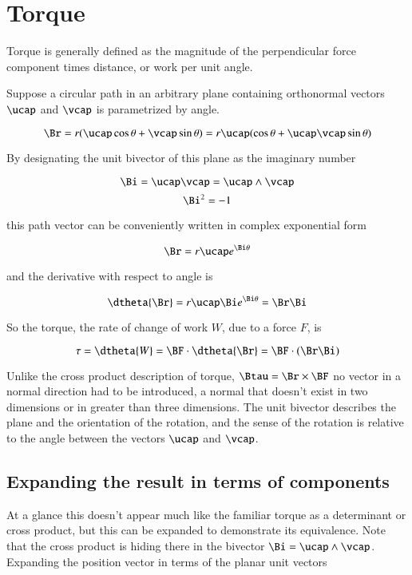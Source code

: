 \chapter{Torque}
\label{chap:gaWikiTorque}
\date{ Oct 13, 2007.  $RCSfile: gaWikiTorque.tex,v $ Last $Revision: 1.13 $ $Date: 2009/06/18 03:31:04 $ }

Torque is generally defined as the magnitude of the perpendicular force component times distance, or work per unit angle.

Suppose a circular path in an arbitrary plane containing orthonormal vectors $\ucap$ and $\vcap$ is parametrized by angle.

\[
\Br = r(\ucap \cos \theta + \vcap \sin \theta) = r \ucap(\cos \theta + \ucap \vcap \sin \theta)
\]

By designating the unit bivector of this plane as the imaginary number

\[
\Bi  = \ucap \vcap = \ucap \wedge \vcap
\]
\[
\Bi ^2 = -1
\]

this path vector can be conveniently written in complex exponential form

\[
\Br = r \ucap e^{\Bi \theta}
\]

and the derivative with respect to angle is

\[
\dtheta{\Br} = r \ucap \Bi  e^{\Bi  \theta} = \Br  \Bi 
\]

So the torque, the rate of change of work $W$, due to a force $F$, is

\[
\tau = \dtheta{W} = \BF \cdot \dtheta{\Br} = \BF \cdot (\Br  \Bi )
\]

Unlike the cross product description of torque, $\Btau = \Br \times \BF$ no vector in a normal direction had to be introduced, a normal that doesn't exist in two dimensions or in greater than three dimensions.  The unit bivector describes the plane and the orientation of the rotation, and the sense of the rotation is relative to the angle between the vectors $\ucap$ and $\vcap$.

\section{Expanding the result in terms of components }

At a glance this doesn't appear much like the familiar torque as a determinant or cross product, but this can be expanded to demonstrate its equivalence.  Note that the cross product is hiding there in the bivector $\Bi = \ucap \wedge \vcap$.  Expanding the position vector in terms of the planar unit vectors 

